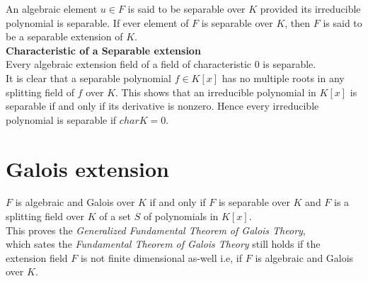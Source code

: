 An algebraic element \(u \in F\) is said to be separable over \(K\) provided its irreducible polynomial is separable. If ever element of \(F\) is separable over \(K\), then \(F\) is said to be a separable extension of \(K\).\\[2mm]

\textbf{Characteristic of a Separable extension}\\
Every algebraic extension field of a field of characteristic \(0\) is separable.\\[2mm]

It is clear that a separable polynomial \(f \in K[x]\) has no multiple roots in any splitting field of \(f\) over \(K\). This shows that an irreducible polynomial in \(K[x]\) is separable if and only if its derivative is nonzero. Hence every irreducible polynomial is separable if \(char K = 0\).


\section{Galois extension}
\(F\) is algebraic and Galois over \(K\) if and only if \(F\) is separable over \(K\) and \(F\) is a splitting field over \(K\) of a set \(S\) of polynomials in \(K[x]\).\\[2mm]

This proves the \textit{Generalized Fundamental Theorem of Galois Theory},\\
which sates the \textit{Fundamental Theorem of Galois Theory} still holds if the extension field \(F\) is not finite dimensional as-well i.e, if \(F\) is algebraic and Galois over \(K\).
